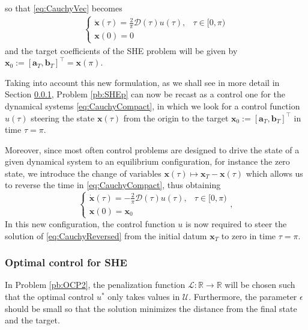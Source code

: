 so that \eqref{eq:CauchyVec} becomes
\begin{align}\label{eq:CauchyCompact}
	\begin{cases}
		\displaystyle\dot{\bm{x}}(\tau) = \frac 2\pi\bm{\mathcal{D}}(\tau) u(\tau),  & \tau \in [0,\pi)
		\\[6pt]
		\bm{x}(0) = {0}
	\end{cases}
\end{align}
and the target coefficients of the SHE problem will be given by $\bm{x}_0:=[\bm{a}_T,\bm{b}_T]^\top=\bm{x}(\pi)$.

Taking into account this new formulation, as we shall see in more detail in Section \ref{Section4}, Problem \ref{pb:SHEp} can now be recast as a control one for the dynamical systems \eqref{eq:CauchyCompact}, in which we look for a control function $u(\tau)$ steering the state $\bm{x}(\tau)$ from the origin to the target $\bm{x}_0:=[\bm{a}_T,\bm{b}_T]^\top$ in time $\tau = \pi$.

Moreover, since most often control problems are designed to drive the state of a given dynamical system to an equilibrium configuration, for instance the zero state, we introduce the change of variables $\bm{x}(\tau)\mapsto \bm{x}_T - \bm{x}(\tau)$ which allows us to reverse the time in \eqref{eq:CauchyCompact}, thus obtaining 
\begin{equation}\label{eq:CauchyReversed}
    \begin{cases}
        \displaystyle\dot{\bm{x}}(\tau) = -\frac 2\pi\bm{\mathcal{D}}(\tau)u(\tau),  & \tau \in [0,\pi)
        \\[6pt]
        \bm{x}(0) = \bm{x}_0
    \end{cases},
\end{equation}
In this new configuration, the control function $u$ is now required to steer the solution of \eqref{eq:CauchyReversed} from the initial datum $\bm{x}_T$ to zero in time $\tau=\pi$. 



\subsubsection{Optimal control for SHE}\label{Section4}

In Problem \ref{pb:OCP2}, the penalization function $\mathcal L: \mathbb{R} \rightarrow \mathbb{R}$ will be chosen such that the optimal control $u^*$ only takes values in $\mathcal U$. Furthermore, the parameter $\epsilon$ should be small so that the solution minimizes the distance from the final state and the target.

